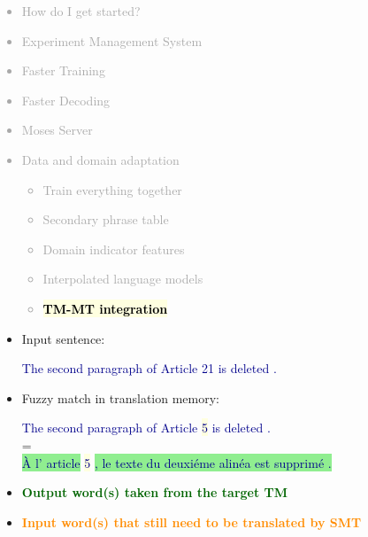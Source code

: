 \documentclass[landscape]{uedslides2C}
\newcommand{\example}[1]{\textcolor{darkblue}{\rm #1}}
\newcommand{\currenttopic}[1]{\colorbox{lightyellow}{\textcolor{black}{\bf #1}}}
\newcommand{\highlight}[1]{\colorbox{lightyellow}{#1}}
\newcommand{\highlightOrange}[1]{\colorbox{lightorange}{#1}}
\newcommand{\highlightGreen}[1]{\colorbox{lightgreen}{#1}}
\begin{document}

\vspace{-5mm}
\textcolor{darkgrey}{
\begin{itemize} \itemsep -1mm
\item {How do I get started?}
\item {Experiment Management System}
\item {Faster Training}
\item {Faster Decoding}
\item {Moses Server}
\item {Data and domain adaptation}
  \begin{itemize} \vspace{-5mm}
  \item {Train everything together}
  \item {Secondary phrase table}
  \item Domain indicator features
\item Interpolated language models
  \item \currenttopic{TM-MT integration}
  \end{itemize}
\end{itemize}
}


\begin{itemize}
\item Input sentence: \vspace{-5mm}
\begin{center}
\example{The second paragraph of Article \highlightOrange{21} is deleted .}
\end{center}
\item Fuzzy match in translation memory: \vspace{-5mm}
\begin{center}
\example{The second paragraph of Article \highlight{5} is deleted .}\\
=\\
\example{\highlightGreen{{\`A} l' article} \highlight{5} \highlightGreen{, le texte du deuxi{\'e}me alin{\'e}a est supprim{\'e} .}}
\end{center}
\item[] \textcolor{darkgreen}{\bf Output word(s) taken from the target TM}  \vspace{-5mm}
\item[] \textcolor{darkorange}{\bf Input word(s) that still need to be translated by SMT}
\end{itemize}
\end{document}

